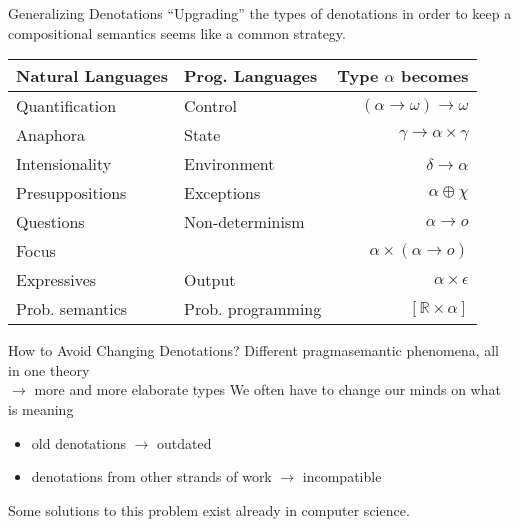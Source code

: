 \documentclass{beamer}
\begin{document}
\begin{frame}{Generalizing Denotations}
  ``Upgrading'' the types of denotations in order to keep a compositional
  semantics seems like a common strategy.
  \vfill
  \begin{tabular}{llr}
    Natural Languages & Prog. Languages & Type $\alpha$ becomes \\
    \hline
    Quantification & Control &
    $(\alpha \to \omega) \to \omega$ \\
    Anaphora & State &
    $\gamma \to \alpha \times \gamma$ \\
    Intensionality & Environment &
    $\delta \to \alpha$ \\
    Presuppositions & Exceptions &
    $\alpha \oplus \chi$ \\
    Questions & Non-determinism &
    $\alpha \to o$ \\
    Focus & &
    $\alpha \times (\alpha \to o)$ \\
    Expressives & Output &
    $\alpha \times \epsilon$ \\
    Prob. semantics & Prob. programming &
    $[\mathbb{R} \times \alpha]$ \\
  \end{tabular}
\end{frame}

\begin{frame}{How to Avoid Changing Denotations?}
  Different pragmasemantic phenomena, all in one theory \\
    $\rightarrow$ more and more elaborate types
  \vfill
  \pause
  We often have to change our minds on what is meaning
  \begin{itemize}
  \item old denotations $\rightarrow$ outdated
  \item denotations from other strands of work $\rightarrow$ incompatible
  \end{itemize}
  \pause
  \vfill
  Some solutions to this problem exist already in computer science.
\end{frame}

\newcommand{\includepicture}[1]{
    \texttt{[image: dias/\#1.eps]}
}
\end{document}
